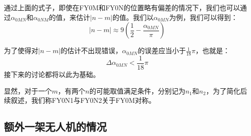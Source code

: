 \documentclass[aspectratio=169]{beamer}
\begin{document}
\begin{frame}
    通过上面的式子，即使在FY0M和FY0N的位置略有偏差的情况下，我们也可以通过$\alpha_{0MN}$和$\alpha_{0NM}$的值，来估计$|n-m|$的值。我们以$\alpha_{0MN}$为例，我们可以得到：
    \begin{equation}
        \left|n-m\right| \approx 9\left(\frac{1}{2} - \frac{\alpha_{0MN}}{\pi}\right)
    \end{equation}

    为了使得对$\left|n-m\right|$的估计不出现错误，$\alpha_{0MN}$的误差应当小于$\frac{1}{18}\pi$，也就是：
    \begin{equation}
        \Delta\alpha_{0MN} < \frac{1}{18}\pi
        \label{eq:误差条件}
    \end{equation}
    接下来的讨论都将以此为基础。

    显然，对于一个$m$，有两个$n$的可能取值满足条件，分别记为$n_1$和$n_2$，为了简化后续叙述，我们称FY0N1与FY0N2关于FY0M对称。
\end{frame}

\subsection{额外一架无人机的情况}
\end{document}
